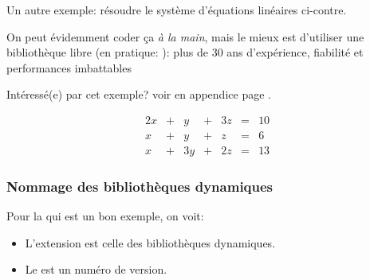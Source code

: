 \begin{boxedminipage}{0.95\textwidth}\label{solve}
\begin{minipage}{0.48\textwidth}
  Un autre exemple: résoudre le système d'équations linéaires ci-contre.

  On peut évidemment coder ça \textsl{à la main},  mais le mieux est
  d'utiliser une bibliothèque libre (en pratique: ): plus
  de 30 ans 
  d'expérience, fiabilité et performances
  imbattables

  Intéressé(e) par cet exemple? voir en appendice
    page \pageref{lu}. 
\end{minipage}
\begin{minipage}{0.48\textwidth}
\begin{alignat*}{4}
   2x & {}+{} &  y & {}+{} & 3z & {}={} & 10 \\
    x & {}+{} &  y & {}+{} &  z & {}={} &  6 \\
    x & {}+{} & 3y & {}+{} & 2z & {}={} & 13
\end{alignat*}
\end{minipage}
\end{boxedminipage}

\subsubsection*{Nommage des bibliothèques dynamiques}
Pour la  qui est un bon exemple, on voit:


\begin{itemize}
\item L'extension  est celle des bibliothèques dynamiques.
\item Le   est un numéro de version.
\end{itemize}
